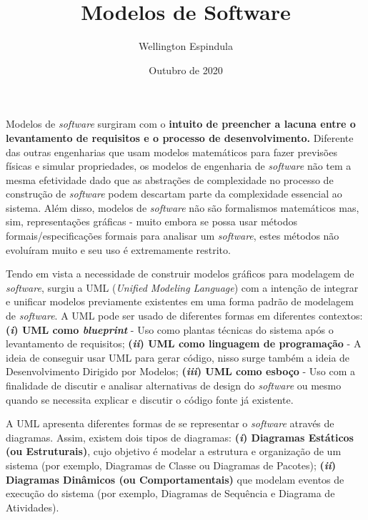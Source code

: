 \documentclass[12pt, a4paper]{article}
\title{Modelos de Software}
\author{Wellington Espindula}
\date{Outubro de 2020}
\newcommand{\tit}[1]{\textit{#1}}
\newcommand{\tb}[1]{\textbf{#1}}
\newcommand{\bitem}[2]{ \tb{(\tit{#1}) {#2}}}
\newcommand{\sw}{\tit{software}}
\newcommand{\ssw}{\tit{software} }
\begin{document}
    \maketitle
   
    Modelos de \ssw surgiram com o \tb{intuito de preencher a lacuna entre o levantamento de requisitos e o processo de desenvolvimento.} Diferente das outras engenharias que usam modelos matemáticos para fazer previsões físicas e simular propriedades, os modelos de engenharia de \ssw não tem a mesma efetividade dado que as abstrações de complexidade no processo de construção de \ssw podem descartam parte da complexidade essencial ao sistema. Além disso, modelos de \ssw não são formalismos matemáticos mas, sim, representações gráficas - muito embora se possa usar métodos formais/especificações formais para analisar um \sw, estes métodos não evoluíram muito e seu uso é extremamente restrito.
    
    Tendo em vista a necessidade de construir modelos gráficos para modelagem de \sw, surgiu a UML (\tit{Unified Modeling Language}) com a intenção de integrar e unificar modelos previamente existentes em uma forma padrão de modelagem de \sw. A UML pode ser usado de diferentes formas em diferentes contextos: \bitem{i}{UML como \tit{blueprint}} - Uso como plantas técnicas do sistema após o levantamento de requisitos; \bitem{ii}{UML como linguagem de programação} - A ideia de conseguir usar UML para gerar código, nisso surge também a ideia de Desenvolvimento Dirigido por Modelos; \bitem{iii}{UML como esboço} - Uso com a finalidade de discutir e analisar alternativas de design do \ssw ou mesmo quando se necessita explicar e discutir o código fonte já existente.
    
    A UML apresenta diferentes formas de se representar o \ssw através de diagramas. Assim, existem dois tipos de diagramas: \bitem{i}{Diagramas Estáticos (ou Estruturais)}, cujo objetivo é modelar a estrutura e organização de um sistema (por exemplo, Diagramas de Classe ou Diagramas de Pacotes); \bitem{ii}{Diagramas Dinâmicos (ou Comportamentais)} que modelam eventos de execução do sistema (por exemplo, Diagramas de Sequência e Diagrama de Atividades).
    
\end{document}
